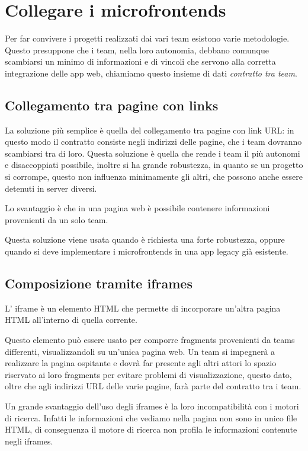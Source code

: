 \chapter{Collegare i microfrontends}\label{ch:composizione}
Per far convivere i progetti realizzati dai vari team esistono varie metodologie. Questo
 presuppone che i team, nella loro autonomia, debbano comunque scambiarsi un minimo di informazioni e di vincoli
che servono alla corretta integrazione delle app web, chiamiamo questo insieme di dati \emph{contratto tra team}.

\section{Collegamento tra pagine con links}
La soluzione più semplice è quella del collegamento tra pagine con link URL: in questo modo il contratto consiste negli indirizzi delle pagine,
che i team dovranno scambiarsi tra di loro.
Questa soluzione è quella che rende i team il più autonomi e disaccoppiati possibile, inoltre
si ha grande robustezza, in quanto se un progetto si corrompe, questo non influenza minimamente gli altri,
che possono anche essere detenuti in server diversi.

Lo svantaggio è che in una pagina web è possibile contenere informazioni provenienti da un solo team.

Questa soluzione viene usata quando è richiesta una forte robustezza, oppure quando si deve implementare 
i microfrontends in una app legacy già esistente.


\section{Composizione tramite iframes}
L' iframe è un elemento HTML che permette di incorporare un'altra pagina HTML all'interno di quella corrente. \cite{mozillaiframe}

Questo elemento può essere usato per comporre fragments provenienti da teams differenti, visualizzandoli su un'unica
pagina web.
Un team si impegnerà a realizzare la pagina ospitante e dovrà far presente agli altri attori lo spazio riservato
ai loro fragments per evitare problemi di visualizzazione, questo dato, oltre che agli indirizzi
URL delle varie pagine, farà parte del contratto tra i team.

Un grande svantaggio dell’uso degli iframes è la loro incompatibilità con i motori di ricerca.
Infatti le informazioni che vediamo nella pagina non sono in unico file HTML, di conseguenza il motore di ricerca non profila le informazioni 
contenute negli iframes.

